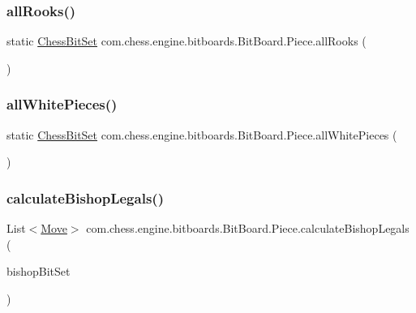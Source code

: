 \subsubsection{\texorpdfstring{allRooks()}{allRooks()}}
{\footnotesize\ttfamily static \mbox{\hyperlink{classcom_1_1chess_1_1engine_1_1bitboards_1_1_chess_bit_set}{Chess\+Bit\+Set}} com.\+chess.\+engine.\+bitboards.\+Bit\+Board.\+Piece.\+all\+Rooks (\begin{DoxyParamCaption}{ }\end{DoxyParamCaption})\hspace{0.3cm}{\ttfamily [static]}}

\mbox{\label{enumcom_1_1chess_1_1engine_1_1bitboards_1_1_bit_board_1_1_piece_ad537bdb874ee139de609526690eb1cc7}} 
\subsubsection{\texorpdfstring{allWhitePieces()}{allWhitePieces()}}
{\footnotesize\ttfamily static \mbox{\hyperlink{classcom_1_1chess_1_1engine_1_1bitboards_1_1_chess_bit_set}{Chess\+Bit\+Set}} com.\+chess.\+engine.\+bitboards.\+Bit\+Board.\+Piece.\+all\+White\+Pieces (\begin{DoxyParamCaption}{ }\end{DoxyParamCaption})\hspace{0.3cm}{\ttfamily [static]}}

\mbox{\label{enumcom_1_1chess_1_1engine_1_1bitboards_1_1_bit_board_1_1_piece_a771b938e53a817bc843010552e9e93e1}} 
\subsubsection{\texorpdfstring{calculateBishopLegals()}{calculateBishopLegals()}}
{\footnotesize\ttfamily List$<$\mbox{\hyperlink{classcom_1_1chess_1_1engine_1_1bitboards_1_1_move}{Move}}$>$ com.\+chess.\+engine.\+bitboards.\+Bit\+Board.\+Piece.\+calculate\+Bishop\+Legals (\begin{DoxyParamCaption}\item[{final \mbox{\hyperlink{classcom_1_1chess_1_1engine_1_1bitboards_1_1_chess_bit_set}{Chess\+Bit\+Set}}}]{bishop\+Bit\+Set }\end{DoxyParamCaption})}

